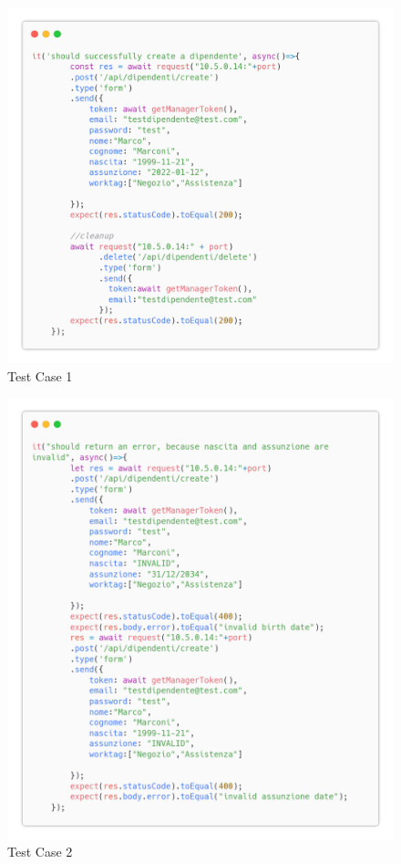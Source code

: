 \documentclass{report}
\begin{document}
\begin{figure}[H]
	\centering\includegraphics[width=1\textwidth]{images/microservizio-dipendenti/tests/create_test_1.png}
	\caption{Test Case 1}
\end{figure}
\begin{figure}[H]
	\centering\includegraphics[width=1\textwidth]{images/microservizio-dipendenti/tests/create_test_2.png}
	\caption{Test Case 2}
\end{figure}
\end{document}
